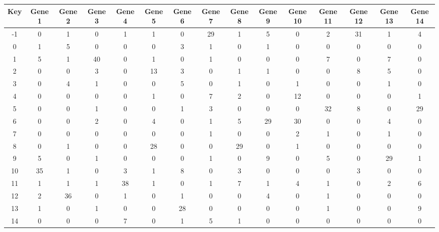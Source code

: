 \begin{tabular}{|c|c|c|c|c|c|c|c|c|c|c|c|c|c|c|}
\hline
Key & Gene 1 & Gene 2 & Gene 3 & Gene 4 & Gene 5 & Gene 6 & Gene 7 & Gene 8 & Gene 9 & Gene 10 & Gene 11 & Gene 12 & Gene 13 & Gene 14 \\
\hline
-1 & 0 & 1 & 0 & 1 & 1 & 0 & 29 & 1 & 5 & 0 & 2 & 31 & 1 & 4 \\
0 & 1 & 5 & 0 & 0 & 0 & 3 & 1 & 0 & 1 & 0 & 0 & 0 & 0 & 0 \\
1 & 5 & 1 & 40 & 0 & 1 & 0 & 1 & 0 & 0 & 0 & 7 & 0 & 7 & 0 \\
2 & 0 & 0 & 3 & 0 & 13 & 3 & 0 & 1 & 1 & 0 & 0 & 8 & 5 & 0 \\
3 & 0 & 4 & 1 & 0 & 0 & 5 & 0 & 1 & 0 & 1 & 0 & 0 & 1 & 0 \\
4 & 0 & 0 & 0 & 0 & 1 & 0 & 7 & 2 & 0 & 12 & 0 & 0 & 0 & 1 \\
5 & 0 & 0 & 1 & 0 & 0 & 1 & 3 & 0 & 0 & 0 & 32 & 8 & 0 & 29 \\
6 & 0 & 0 & 2 & 0 & 4 & 0 & 1 & 5 & 29 & 30 & 0 & 0 & 4 & 0 \\
7 & 0 & 0 & 0 & 0 & 0 & 0 & 1 & 0 & 0 & 2 & 1 & 0 & 1 & 0 \\
8 & 0 & 1 & 0 & 0 & 28 & 0 & 0 & 29 & 0 & 1 & 0 & 0 & 0 & 0 \\
9 & 5 & 0 & 1 & 0 & 0 & 0 & 1 & 0 & 9 & 0 & 5 & 0 & 29 & 1 \\
10 & 35 & 1 & 0 & 3 & 1 & 8 & 0 & 3 & 0 & 0 & 0 & 3 & 0 & 0 \\
11 & 1 & 1 & 1 & 38 & 1 & 0 & 1 & 7 & 1 & 4 & 1 & 0 & 2 & 6 \\
12 & 2 & 36 & 0 & 1 & 0 & 1 & 0 & 0 & 4 & 0 & 1 & 0 & 0 & 0 \\
13 & 1 & 0 & 1 & 0 & 0 & 28 & 0 & 0 & 0 & 0 & 1 & 0 & 0 & 9 \\
14 & 0 & 0 & 0 & 7 & 0 & 1 & 5 & 1 & 0 & 0 & 0 & 0 & 0 & 0 \\
\hline
\end{tabular}